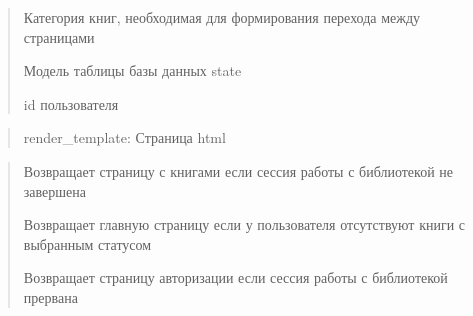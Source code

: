 \documentclass[letterpaper,10pt,russian]{sphinxmanual}
\begin{document}
\begin{fulllineitems}
\begin{description}
\begin{quote}
\begin{description}
\sphinxAtStartPar
Категория книг, необходимая для формирования перехода между страницами

\sphinxAtStartPar
Модель таблицы базы данных state

\sphinxAtStartPar
id пользователя

\end{description}\end{quote}

\end{description}
\begin{quote}\begin{description}
\sphinxAtStartPar
render\_template: Страница html

\end{description}\end{quote}
\begin{description}
\begin{quote}\begin{description}
\sphinxAtStartPar
Возвращает страницу с книгами если сессия работы с библиотекой  не завершена

\sphinxAtStartPar
Возвращает главную страницу если у пользователя отсутствуют книги с выбранным статусом

\sphinxAtStartPar
Возвращает страницу авторизации если сессия работы с библиотекой прервана

\end{description}\end{quote}

\end{description}

\end{fulllineitems}

\end{document}
